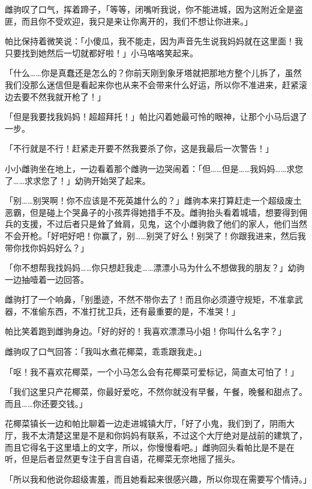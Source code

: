 雌驹叹了口气，挥着蹄子，「等等，闭嘴听我说，你不能进城，因为这附近全是盗匪，而且你不受欢迎，我只是来让你离开的，我们不想让你进来。」

帕比保持着微笑说：「小傻瓜，我不能走，因为声音先生说我妈妈就在这里面！我只要找到她然后一切就都好啦！」小马咯咯笑起来。

「什么……你是真蠢还是怎么的？你前天刚到象牙塔就把那地方整个儿拆了，虽然我们没那么迷信但是看起来你也从来不会带来什么好运，所以你不准进来，赶紧滚边去要不然我就开枪了！」

「但是我要找我妈妈！超超拜托！」帕比闪着她最可怜的眼神，让那个小马后退了一步。

「不行就是不行！赶紧走开要不然我要杀了你，这是我最后一次警告！」

小小雌驹坐在地上，一边看着那个雌驹一边哭闹着：「但……但是……我妈妈……求您了……求求您了！」幼驹开始哭了起来。

「别……别哭啊！你不应该是不死英雄什么的？」雌驹本来打算赶走一个超级废土恶霸，但是碰上个哭鼻子的小孩弄得她措手不及。雌驹抬头看着城墙，想要得到佣兵的支援，不过后者只是耸了耸肩，见鬼，这个小雌驹救了他们的家人，他们当然不会开枪。「好吧好吧！你赢了，别……别哭了好么！别哭了！你跟我进来，然后我带你找你妈妈好么？」

「你不想帮我找妈妈……你只想赶我走……漂漂小马为什么不想做我的朋友？」幼驹一边抽噎着一边回答。

雌驹打了一个响鼻，「别墨迹，不然不带你去了！而且你必须遵守规矩，不准拿武器，不准偷东西，不准打扰卫兵，还有最重要的是，不准哭！」

帕比笑着跑到雌驹身边。「好的好的！我喜欢漂漂马小姐！你叫什么名字？」

雌驹叹了口气回答：「我叫水煮花椰菜，乖乖跟我走。」

「呕！我不喜欢花椰菜，一个小马怎么会有花椰菜可爱标记，简直太可怕了！」

「我们这里只产花椰菜，你最好爱吃，不然你就没有早餐，午餐，晚餐和甜点了。而且……你还要交钱。」

\horizonline


花椰菜镇长一边和帕比聊着一边走进城镇大厅，「好了小鬼，我们到了，阴雨大厅，我不太清楚这里是不是和你妈妈有联系，不过这个大厅绝对是战前的建筑了，而且它得名于这里墙上的文字，所以，你慢慢看吧。」雌驹回头看帕比是不是在听，但是后者显然更专注于自言自语，花椰菜无奈地摇了摇头。

「所以我和他说你超级害羞，而且她看起来很感兴趣，所以你现在需要写个情诗。」

